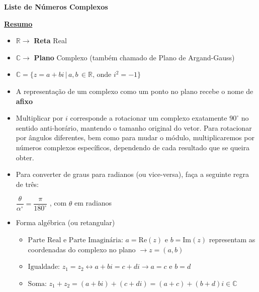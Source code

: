 \documentclass[a4paper, 11pt]{article}
\begin{document}
\begin{center}
\textbf{Liste de Números Complexos}
\end{center}

\textbf{ \underline{Resumo} }
\\


\begin{itemize}

\item $\mathbb{R} \longrightarrow$ \textbf{Reta} Real

\item $\mathbb{C} \longrightarrow$ \textbf{Plano} Complexo (também chamado de Plano de Argand-Gauss)

\item $ \mathbb{C} = \{ z = a + bi \, | \, a,b \, \in \mathbb{R} \textrm{, onde } i^2 = -1 \} $

\item A representação de um complexo como um ponto no plano recebe o nome de \textbf{afixo}

\item Multiplicar por $i$ corresponde a rotacionar um complexo exatamente $90^{\circ}$ no sentido anti-horário, mantendo o tamanho original do vetor. Para rotacionar por ângulos diferentes, bem como para mudar o módulo, multiplicaremos por números complexos específicos, dependendo de cada resultado que se queira obter.

\item Para converter de graus para radianos (ou vice-versa), faça a seguinte regra de três:

$\dfrac{\theta}{\alpha^{\circ}} = \dfrac{\pi}{180^{\circ}}$ , com $\theta$ em radianos

\item Forma algébrica (ou retangular)


	\begin{itemize}

\item $ \textrm{Parte Real e Parte Imagin\'aria: } a = \textrm{Re} (z) \textrm{ e } b = \textrm{Im} (z)$ representam as coordenadas do complexo no plano $\longrightarrow z = (a,b)$

\item $ \textrm{Igualdade: } z_1 = z_2 \longleftrightarrow a + bi = c + di \longrightarrow a = c \textrm{ e } b = d $

\item $ \textrm{Soma: } z_1 + z_2 = (a + bi) + (c + di) = (a + c) + (b + d)i \in \mathbb{C} $


\end{itemize}
\end{itemize}
\end{document}
